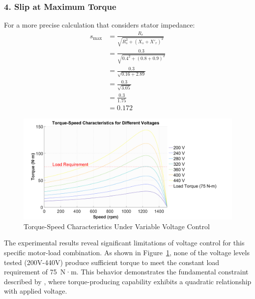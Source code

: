 \documentclass[a4paper,12pt]{IEEEtran}
\begin{document}
\subsubsection{4. Slip at Maximum Torque}

 

For a more precise calculation that considers stator impedance:
\begin{align}
    s_{\text{max}} &= \frac{R_r}{\sqrt{R_s^2 + (X_s + X'_r)^2}} \nonumber \\
    &= \frac{0.3}{\sqrt{0.4^2 + (0.8 + 0.9)^2}} \nonumber \\
    &= \frac{0.3}{\sqrt{0.16 + 2.89}} \nonumber \\
    &= \frac{0.3}{\sqrt{3.05}} \nonumber \\
    &= \frac{0.3}{1.75} \nonumber \\
    &= 0.172
\end{align}

  

\newpage
\begin{figure}[htbp]
    \centering
    \includegraphics[width=\linewidth]{voltage_speed_control.png}
    \caption{Torque-Speed Characteristics Under Variable Voltage Control}
    \label{fig:voltage_control}
\end{figure}

The experimental results reveal significant limitations of voltage control for this specific motor-load combination. As shown in Figure~\ref{fig:voltage_control}, none of the voltage levels tested (200V-440V) produce sufficient torque to meet the constant load requirement of 75~N·m. This behavior demonstrates the fundamental constraint described by \cite{Boldea2014}, where torque-producing capability exhibits a quadratic relationship with applied voltage.
\end{document}
